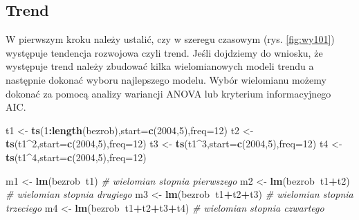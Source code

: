 \documentclass[polish,]{book}
\newenvironment{Shaded}{\begin{snugshade}}{\end{snugshade}}
\newcommand{\CommentTok}[1]{\textcolor[rgb]{0.56,0.35,0.01}{\textit{#1}}}
\newcommand{\DataTypeTok}[1]{\textcolor[rgb]{0.13,0.29,0.53}{#1}}
\newcommand{\DecValTok}[1]{\textcolor[rgb]{0.00,0.00,0.81}{#1}}
\newcommand{\KeywordTok}[1]{\textcolor[rgb]{0.13,0.29,0.53}{\textbf{#1}}}
\newcommand{\NormalTok}[1]{#1}
\newcommand{\OperatorTok}[1]{\textcolor[rgb]{0.81,0.36,0.00}{\textbf{#1}}}
\newcommand{\StringTok}[1]{\textcolor[rgb]{0.31,0.60,0.02}{#1}}
\begin{document}
\hypertarget{part_10.2.1}{%
\subsection{Trend}\label{part_10.2.1}}

W pierwszym kroku należy ustalić, czy w szeregu czasowym (rys. \ref{fig:wy101}) występuje tendencja rozwojowa czyli trend. Jeśli dojdziemy do wniosku, że występuje
trend należy zbudować kilka wielomianowych modeli trendu a następnie dokonać wyboru najlepszego modelu. Wybór wielomianu możemy dokonać za pomocą analizy
wariancji ANOVA lub kryterium informacyjnego AIC.

\begin{Shaded}
\begin{Highlighting}[]
\NormalTok{t1 <-}\StringTok{ }\KeywordTok{ts}\NormalTok{(}\DecValTok{1}\OperatorTok{:}\KeywordTok{length}\NormalTok{(bezrob),}\DataTypeTok{start=}\KeywordTok{c}\NormalTok{(}\DecValTok{2004}\NormalTok{,}\DecValTok{5}\NormalTok{),}\DataTypeTok{freq=}\DecValTok{12}\NormalTok{)}
\NormalTok{t2 <-}\StringTok{ }\KeywordTok{ts}\NormalTok{(t1}\OperatorTok{^}\DecValTok{2}\NormalTok{,}\DataTypeTok{start=}\KeywordTok{c}\NormalTok{(}\DecValTok{2004}\NormalTok{,}\DecValTok{5}\NormalTok{),}\DataTypeTok{freq=}\DecValTok{12}\NormalTok{)}
\NormalTok{t3 <-}\StringTok{ }\KeywordTok{ts}\NormalTok{(t1}\OperatorTok{^}\DecValTok{3}\NormalTok{,}\DataTypeTok{start=}\KeywordTok{c}\NormalTok{(}\DecValTok{2004}\NormalTok{,}\DecValTok{5}\NormalTok{),}\DataTypeTok{freq=}\DecValTok{12}\NormalTok{)}
\NormalTok{t4 <-}\StringTok{ }\KeywordTok{ts}\NormalTok{(t1}\OperatorTok{^}\DecValTok{4}\NormalTok{,}\DataTypeTok{start=}\KeywordTok{c}\NormalTok{(}\DecValTok{2004}\NormalTok{,}\DecValTok{5}\NormalTok{),}\DataTypeTok{freq=}\DecValTok{12}\NormalTok{)}
\end{Highlighting}
\end{Shaded}

\begin{Shaded}
\begin{Highlighting}[]
\NormalTok{m1 <-}\StringTok{ }\KeywordTok{lm}\NormalTok{(bezrob}\OperatorTok{~}\NormalTok{t1)          }\CommentTok{# wielomian stopnia pierwszego}
\NormalTok{m2 <-}\StringTok{ }\KeywordTok{lm}\NormalTok{(bezrob}\OperatorTok{~}\NormalTok{t1}\OperatorTok{+}\NormalTok{t2)       }\CommentTok{# wielomian stopnia drugiego}
\NormalTok{m3 <-}\StringTok{ }\KeywordTok{lm}\NormalTok{(bezrob}\OperatorTok{~}\NormalTok{t1}\OperatorTok{+}\NormalTok{t2}\OperatorTok{+}\NormalTok{t3)    }\CommentTok{# wielomian stopnia trzeciego}
\NormalTok{m4 <-}\StringTok{ }\KeywordTok{lm}\NormalTok{(bezrob}\OperatorTok{~}\NormalTok{t1}\OperatorTok{+}\NormalTok{t2}\OperatorTok{+}\NormalTok{t3}\OperatorTok{+}\NormalTok{t4) }\CommentTok{# wielomian stopnia czwartego}
\end{Highlighting}
\end{Shaded}
\end{document}
